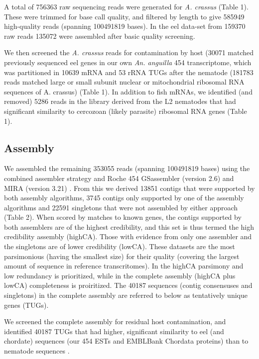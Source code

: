 \documentclass[10pt]{bmc_article}
\newenvironment{bmcformat}{\begin{raggedright}\baselineskip20pt\sloppy\setboolean{publ}{false}}{\end{raggedright}\baselineskip20pt\sloppy}
\begin{document}
\begin{bmcformat}
A total of 756363 raw sequencing reads were
generated for \textit{A. crassus} (Table 1). These were trimmed for
base call quality, and filtered by length to give
585949 high-quality reads (spanning
100491819 bases). In the eel data-set
from 159370 raw reads 135072 were
assembled after basic quality screening.

We then screened the \textit{A. crassus} reads for contamination by
host (30071 matched previously
sequenced eel genes in our own \textit{An. anguilla} 454
transcriptome, which was partitioned in 10639
mRNA and 53 rRNA TUGs after
the nematode (181783 reads matched large
or small subunit nuclear or mitochondrial ribosomal RNA sequences of
A. crassus) (Table 1). In addition to fish mRNAs, we identified (and
removed) 5286 reads in the
library derived from the L2 nematodes that had significant similarity
to cercozoan (likely parasite) ribosomal RNA genes (Table 1).

\subsection*{Assembly}



We assembled the remaining 353055 reads (spanning
100491819 bases) using the combined assembler strategy
\cite{pmid20950480} and Roche 454 GSassembler (version 2.6) and MIRA
(version 3.21) \cite{miraEST}. From this we derived 13851
contigs that were supported by both assembly algorithms,
3745 contigs only supported by one of the assembly
algorithms and 22591 singletons that were not assembled by
either approach (Table 2). When scored by matches to known genes, the
contigs supported by both assemblers are of the highest credibility,
and this set is thus termed the high credibility assembly
(highCA). Those with evidence from only one assembler and the
singletons are of lower credibility (lowCA). These datasets are the
most parsimonious (having the smallest size) for their quality
(covering the largest amount of sequence in reference
transcritomes). In the highCA parsimony and low redundancy is
prioritized, while in the complete assembly (highCA plus lowCA)
completeness is proiritized. The 40187 sequences (contig consensuses
and singletons) in the complete assembly are referred to below as
tentatively unique genes (TUGs).




We screened the complete assembly for residual host contamination, and
identified
40187
  TUGs that had higher, significant similarity to eel (and chordate)
  sequences (our 454 ESTs and EMBLBank Chordata proteins) than to
  nematode sequences \cite{pmid21550347}.


\end{bmcformat}
\end{document}
